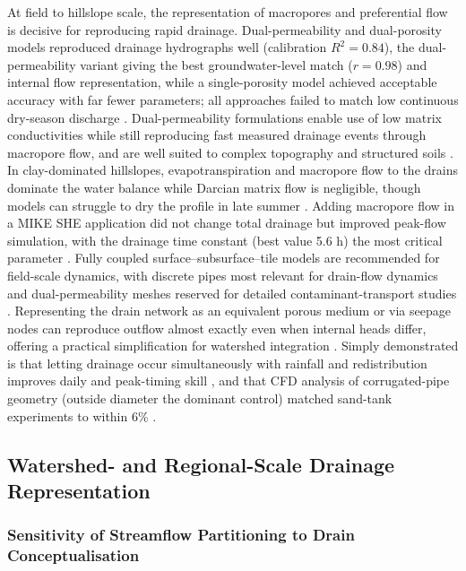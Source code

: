 At field to hillslope scale, the representation of macropores and preferential flow is decisive for reproducing rapid drainage. Dual-permeability and dual-porosity models reproduced drainage hydrographs well (calibration $R^2=0.84$), the dual-permeability variant giving the best groundwater-level match ($r=0.98$) and internal flow representation, while a single-porosity model achieved acceptable accuracy with far fewer parameters; all approaches failed to match low continuous dry-season discharge \parencite{Varvaris2018}. Dual-permeability formulations enable use of low matrix conductivities while still reproducing fast measured drainage events through macropore flow, and are well suited to complex topography and structured soils \parencite{Warsta2014,Salo2017}. In clay-dominated hillslopes, evapotranspiration and macropore flow to the drains dominate the water balance while Darcian matrix flow is negligible, though models can struggle to dry the profile in late summer \parencite{Koivusalo1999}. Adding macropore flow in a MIKE SHE application did not change total drainage but improved peak-flow simulation, with the drainage time constant (best value 5.6 h) the most critical parameter \parencite{Zhou2013}. Fully coupled surface--subsurface--tile models are recommended for field-scale dynamics, with discrete pipes most relevant for drain-flow dynamics and dual-permeability meshes reserved for detailed contaminant-transport studies \parencite{DeSchepper2015}. Representing the drain network as an equivalent porous medium or via seepage nodes can reproduce outflow almost exactly even when internal heads differ, offering a practical simplification for watershed integration \parencite{DeSchepper2015,Carlier2007,Boico2022}. Simply demonstrated is that letting drainage occur simultaneously with rainfall and redistribution improves daily and peak-timing skill \parencite{Xian2017}, and that CFD analysis of corrugated-pipe geometry (outside diameter the dominant control) matched sand-tank experiments to within 6\% \parencite{Wu2022}.

\subsection{Watershed- and Regional-Scale Drainage Representation}

\subsubsection{Sensitivity of Streamflow Partitioning to Drain Conceptualisation}


